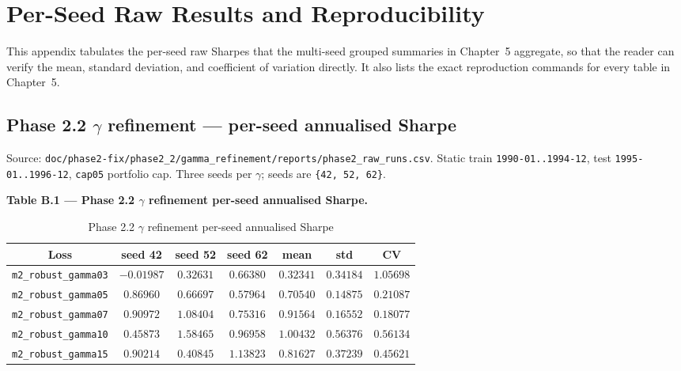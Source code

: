\chapter{Per-Seed Raw Results and Reproducibility}

\label{ch:per-seed-raw-results}

This appendix tabulates the per-seed raw Sharpes that the multi-seed grouped summaries in Chapter~5 aggregate, so that the reader can verify the mean, standard deviation, and coefficient of variation directly. It also lists the exact reproduction commands for every table in Chapter~5.

\section{Phase 2.2 $\gamma$ refinement --- per-seed annualised Sharpe}

\label{sec:phase22-gamma-refinement-per-seed}

Source: \texttt{doc/phase2-fix/phase2\_2/gamma\_refinement/reports/phase2\_raw\_runs.csv}. Static train \texttt{1990-01..1994-12}, test \texttt{1995-01..1996-12}, \texttt{cap05} portfolio cap. Three seeds per $\gamma$; seeds are \texttt{\{42, 52, 62\}}.

\textbf{Table B.1 --- Phase 2.2 $\gamma$ refinement per-seed annualised Sharpe.}

\begin{table}[H]\centering
\caption{Phase 2.2 $\gamma$ refinement per-seed annualised Sharpe}\label{tab:b1-gamma-per-seed}
\begin{tabular}{ccccccc}\toprule
Loss & seed 42 & seed 52 & seed 62 & mean & std & CV \\\midrule
\texttt{m2\_robust\_gamma03} & $-0.01987$ & $0.32631$ & $0.66380$ & $0.32341$ & $0.34184$ & $1.05698$ \\
\texttt{m2\_robust\_gamma05} & $0.86960$ & $0.66697$ & $0.57964$ & $0.70540$ & $0.14875$ & $0.21087$ \\
\texttt{m2\_robust\_gamma07} & $0.90972$ & $1.08404$ & $0.75316$ & $0.91564$ & $0.16552$ & $0.18077$ \\
\texttt{m2\_robust\_gamma10} & $0.45873$ & $1.58465$ & $0.96958$ & $1.00432$ & $0.56376$ & $0.56134$ \\
\texttt{m2\_robust\_gamma15} & $0.90214$ & $0.40845$ & $1.13823$ & $0.81627$ & $0.37239$ & $0.45621$ \\
\bottomrule\end{tabular}
\end{table}

